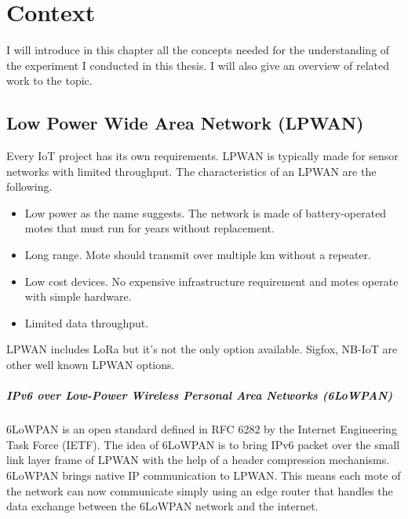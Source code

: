 \chapter{Context\label{section:context}}

I will introduce in this chapter all the concepts needed for the understanding
of the experiment I conducted in this thesis.
I will also give an overview of related work to the topic.

\section{Low Power Wide Area Network (LPWAN)\label{section:lpwan}}

Every IoT project has its own requirements. 
LPWAN is typically made for sensor networks with limited throughput.
The characteristics of an LPWAN are the following.

\begin{itemize}
  \item Low power as the name suggests. The network is made of battery-operated
    motes that must run for years without replacement.
  \item Long range. Mote should transmit over multiple km without a repeater.
  \item Low cost devices. No expensive infrastructure requirement and motes
    operate with simple hardware.
  \item Limited data throughput.
\end{itemize}

LPWAN includes LoRa but it's not the only option available. 
Sigfox, NB-IoT are other well known LPWAN options.

\paragraph{IPv6 over Low-Power Wireless Personal Area Networks (6LoWPAN)}

6LoWPAN is an open standard defined in RFC 6282 by the Internet Engineering
Task Force (IETF).
The idea of 6LoWPAN is to bring IPv6 packet over the small link layer frame of
LPWAN with the help of a header compression mechanisms.
6LoWPAN brings native IP communication to LPWAN.
This means each mote of the network can now communicate simply using an
edge router that handles the data exchange between the 6LoWPAN network and the
internet.

